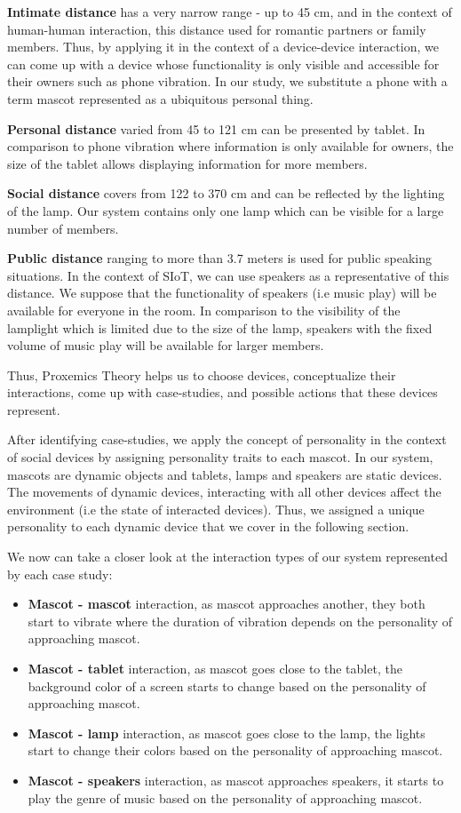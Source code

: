 \textbf{Intimate distance} has a very narrow range - up to 45 cm,
and in the context of human-human interaction, this distance used for romantic partners or family members.
Thus, by applying it in the context of a device-device interaction, we can come up with
a device whose functionality is only visible and accessible for their owners such as phone vibration.
In our study, we substitute a phone with a term mascot represented as a ubiquitous personal thing.

\textbf{Personal distance} varied from 45 to 121 cm can be presented by tablet.
In comparison to phone vibration where information is only available for owners,
the size of the tablet allows displaying information for more members.

\textbf{Social distance} covers from 122 to 370 cm and can be reflected by the lighting of the lamp.
Our system contains only one lamp which can be visible for a large number of members.

\textbf{Public distance} ranging to more than 3.7 meters is used for public speaking situations.
In the context of SIoT, we can use speakers as a representative of this distance.
We suppose that the functionality of speakers (i.e music play) will be available for everyone in the room.
In comparison to the visibility of the lamplight which is limited due to the size of the lamp,
speakers with the fixed volume of music play will be available for larger members.

Thus, Proxemics Theory helps us to choose devices, conceptualize their interactions,
come up with case-studies, and possible actions that these devices represent.

After identifying case-studies, we apply the concept of personality in the context of
social devices by assigning personality traits to each mascot.
In our system, mascots are dynamic objects and tablets, lamps and speakers are static devices.
The movements of dynamic devices, interacting with all other
devices affect the environment (i.e the state of interacted devices).
Thus, we assigned a unique personality to each dynamic device that we cover in the following section.

We now can take a closer look at the interaction types of our system represented by each case study:
\begin{itemize}
  \item \textbf{Mascot - mascot} interaction, as mascot approaches another,
        they both start to vibrate where the duration of vibration depends on the personality of approaching mascot.
  \item \textbf{Mascot - tablet} interaction, as mascot goes close to the tablet, the background
        color of a screen starts to change based on the personality of approaching mascot.
   \item \textbf{Mascot - lamp} interaction, as mascot goes close to the lamp,
        the lights start to change their colors based on the personality of approaching mascot.
   \item \textbf{Mascot - speakers} interaction, as mascot approaches speakers,
        it starts to play the genre of music based on the personality of approaching mascot.
\end{itemize}

